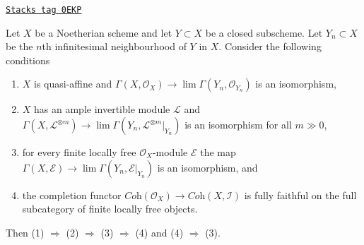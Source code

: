 \begin{lemma}
\label{algebraization-lemma-completion-fully-faithful}
\href{https://stacks.math.columbia.edu/tag/0EKP}{\texttt{Stacks tag 0EKP}}

Let $X$ be a Noetherian scheme and let $Y \subset X$ be a closed subscheme.
Let $Y_n \subset X$ be the $n$th infinitesimal neighbourhood of $Y$ in $X$.
Consider the following conditions
\begin{enumerate}
\item $X$ is quasi-affine and
$\Gamma(X, \mathcal{O}_X) \to \lim \Gamma(Y_n, \mathcal{O}_{Y_n})$
is an isomorphism,
\item $X$ has an ample invertible module $\mathcal{L}$ and
$\Gamma(X, \mathcal{L}^{\otimes m}) \to
\lim \Gamma(Y_n, \mathcal{L}^{\otimes m}|_{Y_n})$
is an isomorphism for all $m \gg 0$,
\item for every finite locally free $\mathcal{O}_X$-module
$\mathcal{E}$ the map
$\Gamma(X, \mathcal{E}) \to \lim \Gamma(Y_n, \mathcal{E}|_{Y_n})$
is an isomorphism, and
\item the completion functor
$\textit{Coh}(\mathcal{O}_X) \to \textit{Coh}(X, \mathcal{I})$
is fully faithful on the full subcategory of finite locally free
objects.
\end{enumerate}
Then (1) $\Rightarrow$ (2) $\Rightarrow$ (3) $\Rightarrow$ (4)
and (4) $\Rightarrow$ (3).
\end{lemma}

